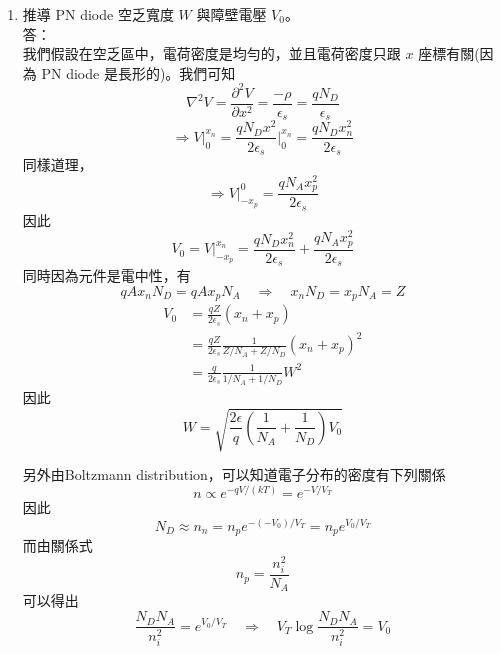 \documentclass[12pt, a4paper]{article}
\begin{document}
\begin{enumerate}[itemsep=20pt, topsep=10pt]
\begin{figure}[H]
{      }\\
      
    \end{figure}

  \item {推導 PN diode 空乏寬度 $W$ 與障壁電壓 $V_0$。} \\[10pt]
    答：\\
    我們假設在空乏區中，電荷密度是均勻的，並且電荷密度只跟 $x$ 座標有關(因為 PN diode 是長形的)。我們可知
    \[ \nabla^2 V = \frac{\partial^2 V}{\partial x^2} = \frac{-\rho}{\epsilon_s} = \frac{q N_D}{\epsilon_s} \]
    \[ \Rightarrow V\Big\rvert_{0}^{x_n} = \frac{q N_D x^2}{2 \epsilon_s} \biggr\rvert_{0}^{x_n} =  \frac{q N_D x^2_n}{2 \epsilon_s} \]
    同樣道理，
    \[ \Rightarrow V\Big\rvert_{-x_p}^{0} = \frac{q N_A x_p^2}{2 \epsilon_s} \]
    因此
    \[
      V_0 = V\Big\rvert_{-x_p}^{x_n} = \frac{q N_D x^2_n}{2 \epsilon_s} + \frac{q N_A x_p^2}{2 \epsilon_s}
    \]
    同時因為元件是電中性，有
    \[ q A x_n N_D = q A x_p N_A \quad \Rightarrow \quad x_n N_D = x_p N_A = Z \]
    \begin{align*}
      V_0 &= \frac{qZ}{2 \epsilon_s} (x_n + x_p)  \\
      &= \frac{q Z }{2 \epsilon_s} \frac{1}{Z/N_A + Z/N_D}  (x_n + x_p)^2 \\
      &= \frac{q}{2\epsilon_s}  \frac{1}{1/N_A + 1/N_D} W^2 
    \end{align*}
    因此
    \[ W = \sqrt{ \frac{2 \epsilon}{q} \left( \frac{1}{N_A} + \frac{1}{N_D}\right)  V_0 } \]

    另外由Boltzmann distribution，可以知道電子分布的密度有下列關係
    \[
      n \propto e^{-qV /(k T)} = e^{-V/V_T} 
    \]
    因此
    \[
      N_D \approx n_n = n_p e^{- (-V_0)/V_T } = n_p e^{V_0/V_T}
    \]
    而由關係式
    \[
      n_p = \frac{n_i^2}{N_A}
    \]
    可以得出
    \[ \frac{N_D N_A}{n_i^2} = e^{V_0/V_T} \quad \Rightarrow \quad V_T \log \frac{N_D N_A}{n_i^2} = V_0 \]
    

\end{enumerate}
\end{document}
